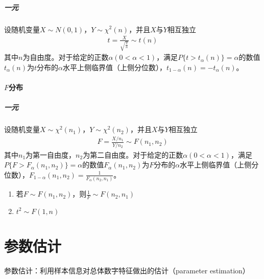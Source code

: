\documentclass[12pt]{book}
\begin{document}
\paragraph{一元}

设随机变量$X\sim N(0,1)$，$Y\sim \chi^{2}(n)$，并且$X$与$Y$相互独立
\begin{gather*}
    t=\frac{X}{\sqrt{\frac{Y}{n}}}\sim t(n)
\end{gather*}
其中$n$为自由度。对于给定的正数$\alpha(0<\alpha<1)$，满足$P\{t>t_{\alpha}(n)\}=\alpha$的数值$t_{\alpha}(n)$为$t$分布的$\alpha$水平上侧临界值（上侧分位数），$t_{1-\alpha}(n)=-t_{\alpha}(n)$。


\subsubsection{$F$分布}


\paragraph{一元}

设随机变量$X\sim \chi^{2}(n_1)$，$Y\sim \chi^{2}(n_2)$，并且$X$与$Y$相互独立
\begin{gather*}
    F=\frac{X/n_{1}}{Y/n_{2}}\sim F(n_1,n_2)
\end{gather*}
其中$n_1$为第一自由度，$n_2$为第二自由度。对于给定的正数$\alpha(0<\alpha<1)$，满足$P\{F>F_{\alpha}(n_1,n_2)\}=\alpha$的数值$F_{\alpha}(n_1,n_2)$为$F$分布的$\alpha$水平上侧临界值（上侧分位数），$F_{1-\alpha}(n_1,n_2)=\frac{1}{F_{\alpha}(n_2,n_1)}$。

\begin{enumerate}[1.]
    \item 若$F\sim F(n_1,n_2)$，则$\frac{1}{F}\sim F(n_2,n_1)$
    \item $t^2\sim F(1,n)$
\end{enumerate}





\chapter{参数估计}

参数估计：利用样本信息对总体数字特征做出的估计（parameter estimation）
\end{document}
